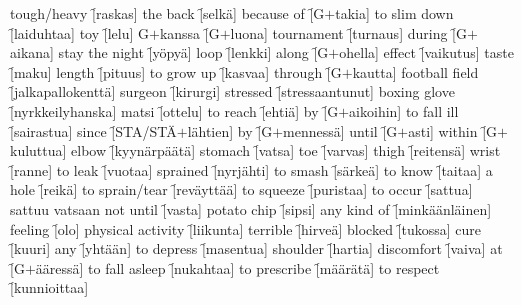 \begin{questions}
  \begin{multicols}{3}
    \raggedcolumns
    \question tough/heavy \f[raskas]
    \question the back    \f[selkä]
    \question because of      \f[G$+$takia]
    \question to slim down    \f[laiduhtaa]
    \question toy \f[lelu]
    \question G$+$kanssa \f[G$+$luona]
    \question tournament \f[turnaus]
    \question during     \f[G$+$aikana]
    \question stay the night \f[yöpyä]
    \question loop           \f[lenkki]
    \question along          \f[G$+$ohella]
    \question effect         \f[vaikutus]
    \question taste          \f[maku]
    \question length         \f[pituus]
    \question to grow up     \f[kasvaa]
    \question through        \f[G$+$kautta]
    \question football field \f[jalkapallokenttä]
    \question surgeon        \f[kirurgi]
    \question stressed \f[stressaantunut]
    \question boxing glove   \f[nyrkkeilyhanska]
    \question matsi         \f[ottelu]
    \question to reach      \f[ehtiä]
    \question by            \f[G$+$aikoihin]
    \question to fall ill   \f[sairastua]
    \question since         \f[STA/STÄ$+$lähtien]
    \question by            \f[G$+$mennessä]
    \question until         \f[G$+$asti]
    \question within        \f[G$+$kuluttua]
    \question elbow         \f[kyynärpäätä]
    \question stomach       \f[vatsa]
    \question toe           \f[varvas]
    \question thigh         \f[reitensä]
    \question wrist         \f[ranne]
    \question to leak       \f[vuotaa]
    \question sprained      \f[nyrjähti]
    \question to smash      \f[särkeä]
    \question to know       \f[taitaa]
    \question a hole        \f[reikä]
    \question to sprain/tear \f[reväyttää]
    \question to squeeze     \f[puristaa]
    \question to occur       \f[sattua]
    \question sattuu vatsaan
    \question not until      \f[vasta]
    \question potato chip    \f[sipsi]
    \question any kind of    \f[minkäänläinen]
    \question feeling        \f[olo]
    \question physical activity \f[liikunta]
    \question terrible          \f[hirveä]
    \question blocked           \f[tukossa]
    \question cure              \f[kuuri]
    \question any               \f[yhtään]
    \question to depress        \f[masentua]
    \question shoulder          \f[hartia]
    \question discomfort             \f[vaiva]
    \question at                \f[G$+$ääressä]
    \question to fall asleep    \f[nukahtaa]
    \question to prescribe      \f[määrätä]
    \question to respect        \f[kunnioittaa]
  \end{multicols}
\end{questions}
